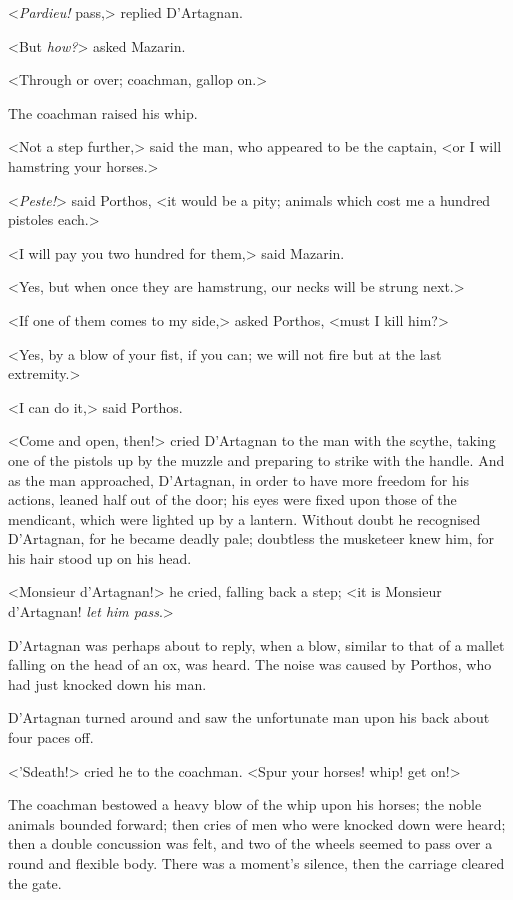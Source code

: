 <\textit{Pardieu!} pass,> replied D'Artagnan.

<But \textit{how?}> asked Mazarin.

<Through or over; coachman, gallop on.>

The coachman raised his whip.

<Not a step further,> said the man, who appeared to be the captain, <or I will hamstring your horses.>

<\textit{Peste!}> said Porthos, <it would be a pity; animals which cost me a hundred pistoles each.>

<I will pay you two hundred for them,> said Mazarin.

<Yes, but when once they are hamstrung, our necks will be strung next.>

<If one of them comes to my side,> asked Porthos, <must I kill him?>

<Yes, by a blow of your fist, if you can; we will not fire but at the last extremity.>

<I can do it,> said Porthos.

<Come and open, then!> cried D'Artagnan to the man with the scythe, taking one of the pistols up by the muzzle and preparing to strike with the handle. And as the man approached, D'Artagnan, in order to have more freedom for his actions, leaned half out of the door; his eyes were fixed upon those of the mendicant, which were lighted up by a lantern. Without doubt he recognised D'Artagnan, for he became deadly pale; doubtless the musketeer knew him, for his hair stood up on his head.

<Monsieur d'Artagnan!> he cried, falling back a step; <it is Monsieur d'Artagnan! \textit{let him pass}.>

D'Artagnan was perhaps about to reply, when a blow, similar to that of a mallet falling on the head of an ox, was heard. The noise was caused by Porthos, who had just knocked down his man.

D'Artagnan turned around and saw the unfortunate man upon his back about four paces off.

<'Sdeath!> cried he to the coachman. <Spur your horses! whip! get on!>

The coachman bestowed a heavy blow of the whip upon his horses; the noble animals bounded forward; then cries of men who were knocked down were heard; then a double concussion was felt, and two of the wheels seemed to pass over a round and flexible body. There was a moment's silence, then the carriage cleared the gate.

